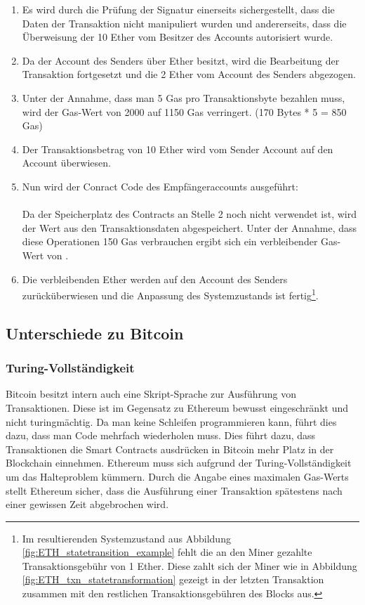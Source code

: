 \begin{enumerate}
\item Es wird durch die Prüfung der Signatur einerseits sichergestellt, dass die Daten der Transaktion nicht manipuliert wurden und andererseits, dass die Überweisung der 10 Ether vom Besitzer des Accounts  autorisiert wurde. 
\item Da der Account des Senders über  Ether besitzt, wird die Bearbeitung der Transaktion fortgesetzt und die 2 Ether vom Account des Senders abgezogen.
\item Unter der Annahme, dass man 5 Gas pro Transaktionsbyte bezahlen muss, wird der Gas-Wert von 2000 auf 1150 Gas verringert. (170 Bytes * 5 = 850 Gas) 
\item Der Transaktionsbetrag von 10 Ether wird vom Sender Account  auf den Account  überwiesen.
\item Nun wird der Conract Code des Empfängeraccounts ausgeführt:\\ \\
Da der Speicherplatz des Contracts an Stelle 2 noch nicht verwendet ist, wird  der Wert  aus den Transaktionsdaten abgespeichert. Unter der Annahme, dass diese Operationen 150 Gas verbrauchen ergibt sich ein verbleibender Gas-Wert von . 
\item Die verbleibenden  Ether werden auf den Account des Senders zurücküberwiesen und die Anpassung des Systemzustands ist fertig\footnote{Im resultierenden Systemzustand aus Abbildung \ref{fig:ETH_statetransition_example} fehlt die an den Miner gezahlte Transaktionsgebühr von 1 Ether. Diese zahlt sich der Miner wie in Abbildung \ref{fig:ETH_txn_statetransformation} gezeigt in der letzten Transaktion zusammen mit den restlichen Transaktionsgebühren des Blocks aus.}.
\end{enumerate}

\subsection{Unterschiede zu Bitcoin}\label{eth_grundlagen_btc_diff} 
\subsubsection{Turing-Vollständigkeit}
Bitcoin besitzt intern auch eine Skript-Sprache zur Ausführung von Transaktionen. Diese ist im Gegensatz zu Ethereum bewusst eingeschränkt und nicht turingmächtig. Da man keine Schleifen programmieren kann, führt dies dazu, dass man Code mehrfach wiederholen muss. Dies führt dazu, dass Transaktionen die Smart Contracts ausdrücken in Bitcoin mehr Platz in der Blockchain einnehmen. Ethereum muss sich aufgrund der Turing-Vollständigkeit um das Halteproblem kümmern. Durch die Angabe eines maximalen Gas-Werts stellt Ethereum sicher, dass die Ausführung einer Transaktion spätestens nach einer gewissen Zeit abgebrochen wird. 
